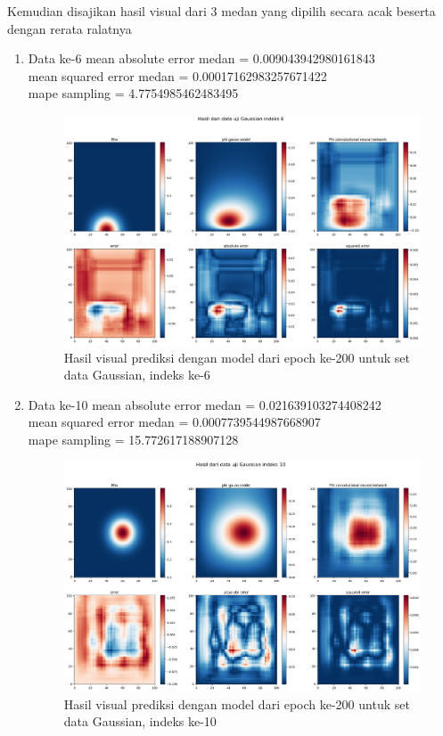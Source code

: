 Kemudian disajikan hasil visual dari 3 medan yang dipilih secara acak beserta dengan rerata ralatnya
\begin{enumerate}
    \item Data ke-6
    mean absolute error medan = 0.009043942980161843\\
    mean squared error medan = 0.00017162983257671422\\
    mape sampling = 4.7754985462483495
    \begin{figure}[h!]
    \centering
    \includegraphics[width=12cm]{gambar/6_200_gaussian.png}
    \caption{Hasil visual prediksi dengan model dari epoch ke-200 untuk set data Gaussian, indeks ke-6}
    \label{6_200_Gaussian}
    \end{figure}

    \item Data ke-10
    mean absolute error medan = 0.021639103274408242\\
    mean squared error medan = 0.0007739544987668907\\
    mape sampling = 15.772617188907128
    \begin{figure}[h!]
    \centering
    \includegraphics[width=12cm]{gambar/10_200_gaussian.png}
    \caption{Hasil visual prediksi dengan model dari epoch ke-200 untuk set data Gaussian, indeks ke-10}
    \label{10_200_Gaussian}
    \end{figure}


\end{enumerate}
